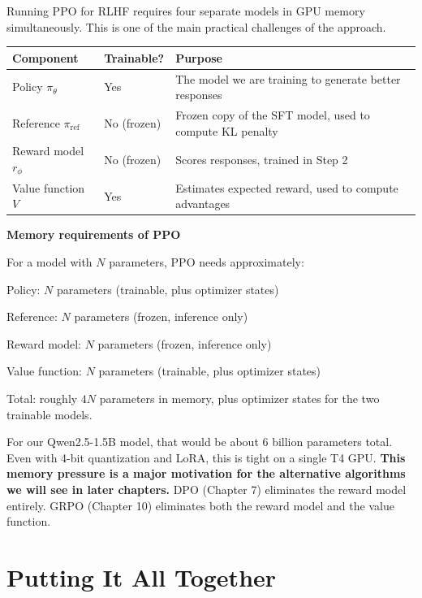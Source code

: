 \begin{chapterenv}
Running PPO for RLHF requires four separate models in GPU memory simultaneously. This is one of the main practical challenges of the approach.

\begin{center}
\begin{tabular}{p{}p{}p{}}
\toprule
\textbf{Component} & \textbf{Trainable?} & \textbf{Purpose} \\
\midrule
Policy $\pi_\theta$ & Yes & The model we are training to generate better responses \\
Reference $\pi_{\text{ref}}$ & No (frozen) & Frozen copy of the SFT model, used to compute KL penalty \\
Reward model $r_\phi$ & No (frozen) & Scores responses, trained in Step 2 \\
Value function $V$ & Yes & Estimates expected reward, used to compute advantages \\
\bottomrule
\end{tabular}
\end{center}

\begin{infobox}
\textbf{Memory requirements of PPO}

For a model with $N$ parameters, PPO needs approximately:

Policy: $N$ parameters (trainable, plus optimizer states)

Reference: $N$ parameters (frozen, inference only)

Reward model: $N$ parameters (frozen, inference only)

Value function: $N$ parameters (trainable, plus optimizer states)

Total: roughly $4N$ parameters in memory, plus optimizer states for the two trainable models.

For our Qwen2.5-1.5B model, that would be about 6 billion parameters total. Even with 4-bit quantization and LoRA, this is tight on a single T4 GPU. \textbf{This memory pressure is a major motivation for the alternative algorithms we will see in later chapters.} DPO (Chapter 7) eliminates the reward model entirely. GRPO (Chapter 10) eliminates both the reward model and the value function.
\end{infobox}

\section{Putting It All Together}


\end{chapterenv}
